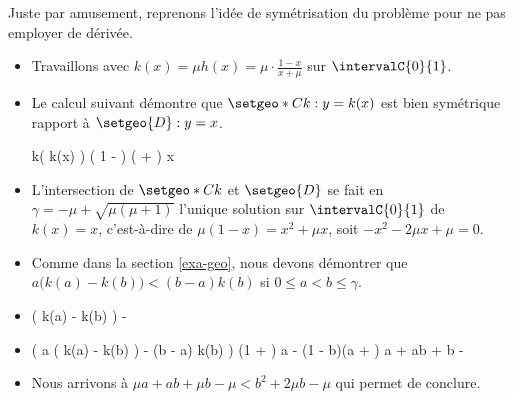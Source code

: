 \begin{remark}
	Juste par amusement, reprenons l'idée de symétrisation du problème pour ne pas employer de dérivée.
	\begin{itemize}
		\item Travaillons avec $k(x) = \mu h(x) = \mu \cdot \frac{1 - x}{x + \mu}$ sur $\intervalC{0}{1}$.


		\item Le calcul suivant démontre que $\setgeo*{C}{k}: y = k(x)$ est bien symétrique rapport à $\setgeo{D}: y = x$.

        \smallskip
        \noindent\kern-8pt\begin{stepcalc}[style=sar]
        	k\big( k(x) \big)
        \explnext{}
        	     \mu
	     		 \Big( 1 - \mu \cdot {} \Big)
        	\div \Big( \mu \cdot {} + \mu \Big)
        \explnext{}
        \explnext{}
        \explnext{}
        	x
        \end{stepcalc}


		\item L'intersection de $\setgeo*{C}{k}$ et $\setgeo{D}$ se fait en $\gamma = - \mu + \sqrt{\mu (\mu + 1)}$ l'unique solution sur $\intervalC{0}{1}$ de
		$k(x) = x$,
		c'est-à-dire de 
		$\mu (1 - x) = x^2 + \mu x$,
		soit
		$- x^2 - 2 \mu x + \mu = 0$.


		\item Comme dans la section \ref{exa-geo}, nous devons démontrer que $a \big( k(a) - k(b) \big) < (b - a) k(b)$ si $0 \leq a < b \leq \gamma$.


		\item 
    	\begin{stepcalc}[style=sar]
    		 \big( k(a) - k(b) \big)
    	\explnext{}
    		 - 
    	\explnext{}
    	\end{stepcalc}


		\item
		\begin{stepcalc}[style=ar*]
			\big(
				a \big( k(a) - k(b) \big) - (b - a) k(b)
			\big)
    	\explnext{}
			(1 + \mu) a - (1 - b)(a + \mu)
    	\explnext{}
    		\mu a + ab + \mu b - \mu
    	\end{stepcalc}


		\item Nous arrivons à
		$\mu a + ab + \mu b - \mu < b^2 + 2 \mu b - \mu$
		qui permet de conclure.
	\end{itemize}
\end{remark}

